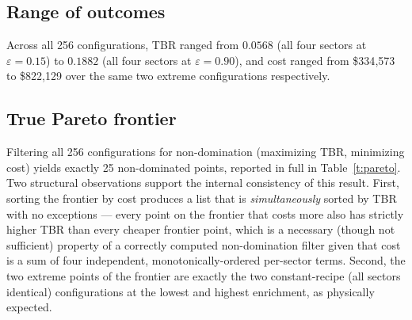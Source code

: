 \documentclass[11pt]{article}
\begin{document}
\subsection{Range of outcomes}

Across all 256 configurations, TBR ranged from $0.0568$ (all four sectors
at $\varepsilon=0.15$) to $0.1882$ (all four sectors at $\varepsilon=0.90$),
and cost ranged from \$334{,}573 to \$822{,}129 over the same two extreme
configurations respectively.

\subsection{True Pareto frontier}

Filtering all 256 configurations for non-domination (maximizing TBR,
minimizing cost) yields exactly 25 non-dominated points, reported in full
in Table~\ref{t:pareto}. Two structural observations support the internal
consistency of this result. First, sorting the frontier by cost produces a
list that is \emph{simultaneously} sorted by TBR with no exceptions ---
every point on the frontier that costs more also has strictly higher TBR
than every cheaper frontier point, which is a necessary (though not
sufficient) property of a correctly computed non-domination filter given
that cost is a sum of four independent, monotonically-ordered per-sector
terms. Second, the two extreme points of the frontier are exactly the two
constant-recipe (all sectors identical) configurations at the lowest and
highest enrichment, as physically expected.
\end{document}
